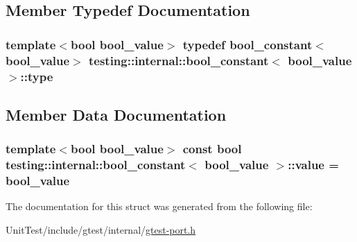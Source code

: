 \subsection{Member Typedef Documentation}
\hypertarget{structtesting_1_1internal_1_1bool__constant_aba6d09ecf7eecea6c93480f0d627a167}{
\subsubsection[{type}]{\setlength{\rightskip}{0pt plus 5cm}template$<$bool bool\+\_\+value$>$ typedef {\bf bool\+\_\+constant}$<$bool\+\_\+value$>$ {\bf testing\+::internal\+::bool\+\_\+constant}$<$ bool\+\_\+value $>$\+::{\bf type}}}\label{structtesting_1_1internal_1_1bool__constant_aba6d09ecf7eecea6c93480f0d627a167}


\subsection{Member Data Documentation}
\hypertarget{structtesting_1_1internal_1_1bool__constant_a499fba6576296b04d99690a486424b32}{
\subsubsection[{value}]{\setlength{\rightskip}{0pt plus 5cm}template$<$bool bool\+\_\+value$>$ const bool {\bf testing\+::internal\+::bool\+\_\+constant}$<$ bool\+\_\+value $>$\+::value = bool\+\_\+value\hspace{0.3cm}{\ttfamily [static]}}}\label{structtesting_1_1internal_1_1bool__constant_a499fba6576296b04d99690a486424b32}


The documentation for this struct was generated from the following file\+:\begin{DoxyCompactItemize}
\item 
Unit\+Test/include/gtest/internal/\hyperlink{gtest-port_8h}{gtest-\/port.\+h}\end{DoxyCompactItemize}
